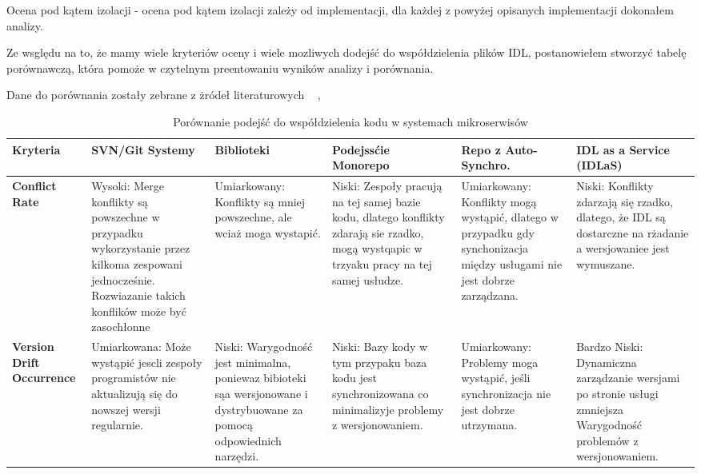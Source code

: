 \documentclass[runningheads,12pt]{llncs}
\begin{document}
Ocena pod kątem izolacji - ocena pod kątem izolacji zależy od implementacji, dla każdej z powyżej opisanych implementacji dokonałem analizy.

Ze wsględu na to, że mamy wiele kryteriów oceny i wiele mozliwych dodejść do współdzielenia plików IDL, postanowiełem stworzyć tabelę porównawczą, która pomoże w czytelnym preentowaniu wyników analizy i porównania.

Dane do porównania zostały zebrane z żródeł literaturowych ~\cite{newman2015building} ,  ~\cite{kleppmann2017designing}

\begin{table}[htbp]
    \centering
    \caption{Porównanie podejść do współdzielenia kodu w systemach mikroserwisów}
    \label{tab:comparison}
    \begin{tabularx}{\textwidth}{|>{\raggedright\arraybackslash}X|>{\raggedright\arraybackslash}X|>{\raggedright\arraybackslash}X|>{\raggedright\arraybackslash}X|>{\raggedright\arraybackslash}X|>{\raggedright\arraybackslash}X|}
    \hline
    \textbf{Kryteria} & \textbf{SVN/Git Systemy} & \textbf{Biblioteki} & \textbf{Podejssćie Monorepo} & \textbf{Repo z Auto-Synchro.} & \textbf{IDL as a Service (IDLaS)} \\
    \hline
    \textbf{Conflict Rate} &
    Wysoki: Merge konflikty są powszechne w przypadku wykorzystanie przez kilkoma zespowani jednocześnie. Rozwiazanie takich konflików może być zasochłonne &
    Umiarkowany: Konflikty są mniej powszechne, ale wciaż moga wystapić. &
    Niski: Zespoły pracują na tej samej bazie kodu, dlatego konflikty zdarają sie rzadko, mogą wystqapic w trzyaku pracy na tej samej usłudze. &
    Umiarkowany: Konflikty mogą wystąpić, dlatego w przypadku gdy synchonizacja między usługami nie jest dobrze zarządzana. &
    Niski: Konflikty zdarzają się rzadko, dlatego, że IDL są dostarczne na rżadanie a wersjowaniee jest wymuszane. \\
    \hline
    \textbf{Version Drift Occurrence} &
    Umiarkowana: Może wystąpić jescli zespoły programistów nie aktualizują się do nowszej wersji regularnie. &
    Niski: Warygodność jest minimalna, poniewaz bibioteki sąa wersjonowane i dystrybuowane za pomocą odpowiednich narzędzi. &
    Niski: Bazy kody w tym przypaku baza kodu jest synchronizowana co minimalizyje problemy z wersjonowaniem. &
    Umiarkowany: Problemy moga wystąpić, jeśli synchronizacja nie jest dobrze utrzymana. &
    Bardzo Niski: Dynamiczna zarządzanie wersjami po stronie usługi zmniejsza Warygodność problemów z wersjonowaniem. \\

\end{tabularx}
\end{table}
\end{document}
